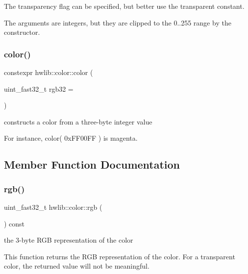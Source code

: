 The transparency flag can be specified, but better use the transparent constant.

The arguments are integers, but they are clipped to the 0..255 range by the constructor. \mbox{\label{classhwlib_1_1color_aa8d2263ebf5efe2221171217166a669f}} 
\subsubsection{\texorpdfstring{color()}{color()}\hspace{0.1cm}{\footnotesize\ttfamily [4/4]}}
{\footnotesize\ttfamily constexpr hwlib\+::color\+::color (\begin{DoxyParamCaption}\item[{uint\+\_\+fast32\+\_\+t}]{rgb32 = {} }\end{DoxyParamCaption})\hspace{0.3cm}{\ttfamily [inline]}}

constructs a color from a three-\/byte integer value

For instance, color( 0x\+F\+F00\+F\+F ) is magenta. 

\subsection{Member Function Documentation}
\mbox{\label{classhwlib_1_1color_a845e1e2526d372640adb44cf98e8f3f4}} 
\subsubsection{\texorpdfstring{rgb()}{rgb()}\hspace{0.1cm}{\footnotesize\ttfamily [1/2]}}
{\footnotesize\ttfamily uint\+\_\+fast32\+\_\+t hwlib\+::color\+::rgb (\begin{DoxyParamCaption}{ }\end{DoxyParamCaption}) const\hspace{0.3cm}{\ttfamily [inline]}}

the 3-\/byte R\+GB representation of the color

This function returns the R\+GB representation of the color. For a transparent color, the returned value will not be meaningful. \mbox{\label{classhwlib_1_1color_a845e1e2526d372640adb44cf98e8f3f4}} 
